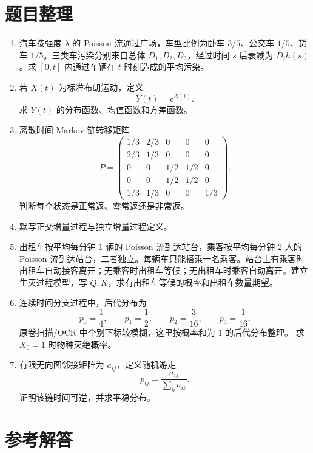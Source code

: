 \documentclass[12pt,a4paper,openany]{ctexrep}
\theoremstyle{definition}
\newcommand{\e}{\mathrm{e}}
\begin{document}
\section{题目整理}

\begin{enumerate}[label=\textbf{题 \arabic*:}]
	\item 汽车按强度 $\lambda$ 的 Poisson 流通过广场，车型比例为卧车 $3/5$、公交车 $1/5$、货车 $1/5$。三类车污染分别来自总体 $D_1,D_2,D_3$，经过时间 $s$ 后衰减为 $D_i h(s)$。求 $[0,t]$ 内通过车辆在 $t$ 时刻造成的平均污染。
	\item 若 $X(t)$ 为标准布朗运动，定义
	\[
	Y(t)=\e^{X(t)}.
	\]
	求 $Y(t)$ 的分布函数、均值函数和方差函数。
	\item 离散时间 Markov 链转移矩阵
	\[
	P=
	\begin{pmatrix}
	1/3&2/3&0&0&0\\
	2/3&1/3&0&0&0\\
	0&0&1/2&1/2&0\\
	0&0&1/2&1/2&0\\
	1/3&1/3&0&0&1/3
	\end{pmatrix}.
	\]
	判断每个状态是正常返、零常返还是非常返。
	\item 默写正交增量过程与独立增量过程定义。
	\item 出租车按平均每分钟 $1$ 辆的 Poisson 流到达站台，乘客按平均每分钟 $2$ 人的 Poisson 流到达站台，二者独立。每辆车只能搭乘一名乘客。站台上有乘客时出租车自动接客离开；无乘客时出租车等候；无出租车时乘客自动离开。建立生灭过程模型，写 $Q,K$，求有出租车等候的概率和出租车数量期望。
	\item 连续时间分支过程中，后代分布为
	\[
	p_0=\frac14,\qquad p_1=\frac12,\qquad p_2=\frac3{16},\qquad p_3=\frac1{16}.
	\]
	原卷扫描/OCR 中个别下标较模糊，这里按概率和为 $1$ 的后代分布整理。
	求 $X_0=1$ 时物种灭绝概率。
	\item 有限无向图邻接矩阵为 $a_{ij}$，定义随机游走
	\[
	p_{ij}=\frac{a_{ij}}{\sum_k a_{ik}}.
	\]
	证明该链时间可逆，并求平稳分布。
\end{enumerate}

\section{参考解答}
\end{document}
